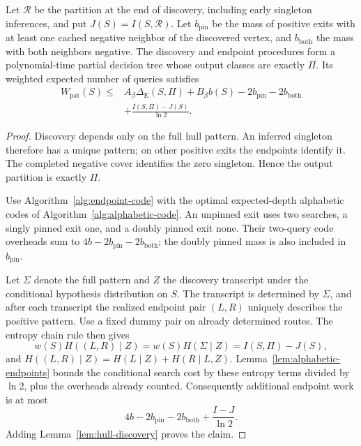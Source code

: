 \begin{lemma}\label{lem:pruning-macro}
Let $\mathcal R$ be the partition at the end of discovery, including
early singleton inferences, and put $J(S)=I(S,\mathcal R)$.
Let $b_{\mathrm{pin}}$ be the mass of positive exits with at least
one cached negative neighbor of the discovered vertex, and
$b_{\mathrm{both}}$ the mass with both neighbors negative.
The discovery and endpoint procedures form a polynomial-time partial
decision tree whose output classes are exactly $\Pi$. Its weighted
expected number of queries satisfies
\begin{equation}\label{eq:pruning-macro}
 \begin{aligned}
 W_{\mathrm{pat}}(S)\le{}&
 A_\beta\Delta_{\mathrm E}(S,\Pi)+B_\beta b(S)
       -2b_{\mathrm{pin}}-2b_{\mathrm{both}}\\
 &+\frac{I(S,\Pi)-J(S)}{\ln2}.
 \end{aligned}
\end{equation}
\end{lemma}
\begin{proof}
Discovery depends only on the full hull pattern. An inferred singleton
therefore has a unique pattern; on other positive exits the endpoints
identify it. The completed negative cover identifies the zero singleton.
Hence the output partition is exactly $\Pi$.

Use Algorithm~\ref{alg:endpoint-code} with the optimal expected-depth
alphabetic codes of Algorithm~\ref{alg:alphabetic-code}. An unpinned exit
uses two searches, a singly pinned exit one, and a doubly pinned exit
none. Their two-query code overheads sum to
$4b-2b_{\mathrm{pin}}-2b_{\mathrm{both}}$; the doubly pinned mass is
also included in $b_{\mathrm{pin}}$.

Let $\Sigma$ denote the full pattern and $Z$ the discovery transcript
under the conditional hypothesis distribution on $S$. The transcript
is determined by $\Sigma$, and after each transcript the realized
endpoint pair $(L,R)$ uniquely describes the positive pattern. Use a
fixed dummy pair on already determined routes. The entropy chain rule
then gives
\[
 w(S)H((L,R)\mid Z)=w(S)H(\Sigma\mid Z)=I(S,\Pi)-J(S),
\]
and $H((L,R)\mid Z)=H(L\mid Z)+H(R\mid L,Z)$.
Lemma~\ref{lem:alphabetic-endpoints} bounds the conditional search cost
by these entropy terms divided by $\ln2$, plus the overheads already
counted. Consequently additional endpoint work is at most
\[
 4b-2b_{\mathrm{pin}}-2b_{\mathrm{both}}
     +\frac{I-J}{\ln2}.
\]
Adding Lemma~\ref{lem:hull-discovery} proves the claim.
\end{proof}

